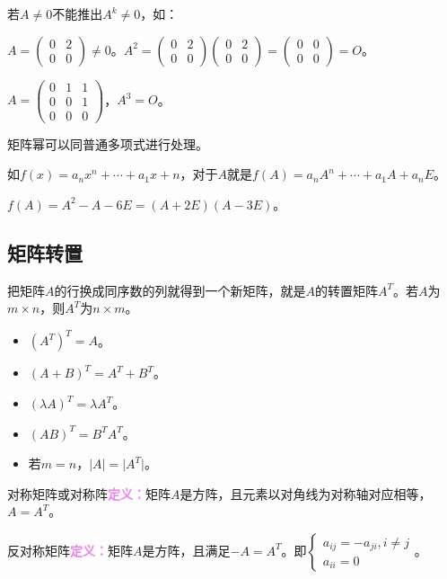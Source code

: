 \documentclass[UTF8, 12pt]{ctexart}
\begin{document}
若$A\neq 0$不能推出$A^k\neq 0$，如：\medskip

$A=\left(
\begin{array}{cc}
0 & 2 \\
0 & 0
\end{array}
\right)\neq 0$。$A^2=\left(
\begin{array}{cc}
0 & 2 \\
0 & 0
\end{array}
\right)\left(
\begin{array}{cc}
0 & 2 \\
0 & 0
\end{array}
\right)=\left(
\begin{array}{cc}
0 & 0 \\
0 & 0
\end{array}
\right)=O$。\medskip

$A=\left(
\begin{array}{ccc}
0 & 1 & 1 \\
0 & 0 & 1 \\
0 & 0 & 0
\end{array}
\right)$，$A^3=O$。\medskip

矩阵幂可以同普通多项式进行处理。

如$f(x)=a_nx^n+\cdots+a_1x+n$，对于$A$就是$f(A)=a_nA^n+\cdots+a_1A+a_nE$。

$f(A)=A^2-A-6E=(A+2E)(A-3E)$。

\subsection{矩阵转置}

把矩阵$A$的行换成同序数的列就得到一个新矩阵，就是$A$的转置矩阵$A^T$。若$A$为$m\times n$，则$A^T$为$n\times m$。

\begin{itemize}
\item $(A^T)^T=A$。
\item $(A+B)^T=A^T+B^T$。
\item $(\lambda A)^T=\lambda A^T$。
\item $(AB)^T=B^TA^T$。
\item 若$m=n$，$\vert A\vert=\vert A^T\vert$。
\end{itemize}

对称矩阵或对称阵\textcolor{violet}{\textbf{定义：}}矩阵$A$是方阵，且元素以对角线为对称轴对应相等，$A=A^T$。

反对称矩阵\textcolor{violet}{\textbf{定义：}}矩阵$A$是方阵，且满足$-A=A^T$。即$\left\{\begin{array}{l}
a_{ij}=-a_{ji},i\neq j \\
a_{ii}=0
\end{array}\right.$。
\end{document}
